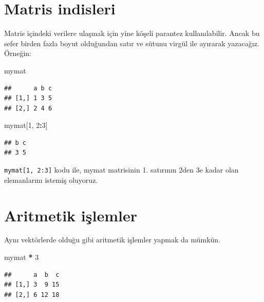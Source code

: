 \documentclass[
]{book}
\newenvironment{Shaded}{\begin{snugshade}}{\end{snugshade}}
\newcommand{\DecValTok}[1]{\textcolor[rgb]{0.00,0.00,0.81}{#1}}
\newcommand{\NormalTok}[1]{#1}
\newcommand{\OperatorTok}[1]{\textcolor[rgb]{0.81,0.36,0.00}{\textbf{#1}}}
\newcommand{\StringTok}[1]{\textcolor[rgb]{0.31,0.60,0.02}{#1}}
\begin{document}
\hypertarget{matris-indisleri}{%
\section{Matris indisleri}\label{matris-indisleri}}

Matris içindeki verilere ulaşmak için yine köşeli parantez kullanılabilir. Ancak bu sefer birden fazla boyut olduğundan satır ve sütunu virgül ile ayırarak yazacağız. Örneğin:

\begin{Shaded}
\begin{Highlighting}[]
\NormalTok{mymat}
\end{Highlighting}
\end{Shaded}

\begin{verbatim}
##      a b c
## [1,] 1 3 5
## [2,] 2 4 6
\end{verbatim}

\begin{Shaded}
\begin{Highlighting}[]
\NormalTok{mymat[}\DecValTok{1}\NormalTok{, }\DecValTok{2}\OperatorTok{:}\DecValTok{3}\NormalTok{]}
\end{Highlighting}
\end{Shaded}

\begin{verbatim}
## b c 
## 3 5
\end{verbatim}

\texttt{mymat{[}1,\ 2:3{]}} kodu ile, mymat matrisinin 1. satırının 2den 3e kadar olan elemanlarını istemiş oluyoruz.

\hypertarget{aritmetik-iux15flemler}{%
\section{Aritmetik işlemler}\label{aritmetik-iux15flemler}}

Aynı vektörlerde olduğu gibi aritmetik işlemler yapmak da mümkün.

\begin{Shaded}
\begin{Highlighting}[]
\NormalTok{mymat }\OperatorTok{*}\StringTok{ }\DecValTok{3}
\end{Highlighting}
\end{Shaded}

\begin{verbatim}
##      a  b  c
## [1,] 3  9 15
## [2,] 6 12 18
\end{verbatim}
\end{document}
